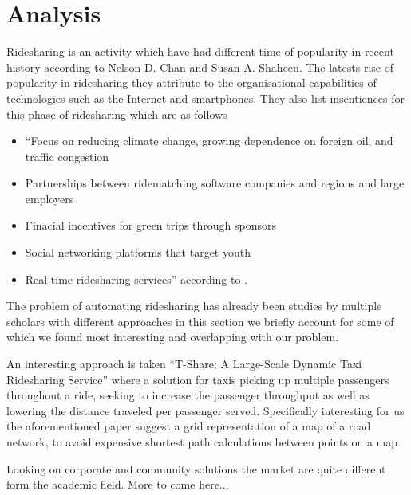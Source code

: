 \section{Analysis}
Ridesharing is an activity which have had different time of popularity in recent history according to Nelson D. Chan and Susan A. Shaheen\cite{doi:10.1080/01441647.2011.621557}.
The latests rise of popularity in ridesharing they attribute to the organisational capabilities of technologies such as the Internet and smartphones.
They also list insentiences for this phase of ridesharing which are as follows 
\begin{itemize}
  \item ``Focus on reducing climate change, growing dependence on foreign oil, and traffic congestion
  \item Partnerships between ridematching software companies and regions and large employers
  \item Finacial incentives for green trips through sponsors
  \item Social networking platforms that target youth
  \item Real-time ridesharing services'' according to \cite{doi:10.1080/01441647.2011.621557}.
\end{itemize}


The problem of automating ridesharing has already been studies by multiple scholars with different approaches in this section we briefly account for some of which we found most interesting and overlapping with our problem. 

An interesting approach is taken ``T-Share: A Large-Scale Dynamic Taxi Ridesharing Service'' where a solution for taxis picking up multiple passengers throughout a ride, seeking to increase the passenger throughput as well as lowering the distance traveled per passenger served\cite{ShuoMa2013}.
Specifically interesting for us the aforementioned paper suggest a grid representation of a map of a road network, to avoid expensive shortest path calculations between points on a map.

Looking on corporate and community solutions the market are quite different form the academic field. More to come here...